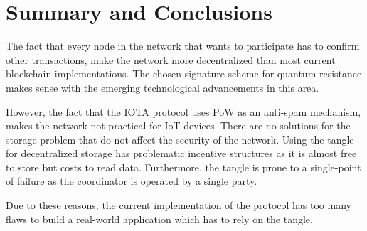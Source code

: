 \chapter{Summary and Conclusions}

The fact that every node in the network that wants to participate has to confirm other transactions, make the network more decentralized than most current blockchain implementations. The chosen signature scheme for quantum resistance makes sense with the emerging technological advancements in this area. 

However, the fact that the IOTA protocol uses PoW as an anti-spam mechanism, makes the network not practical for IoT devices. There are no solutions for the storage problem that do not affect the security of the network. Using the tangle for decentralized storage has problematic incentive structures as it is almost free to store but costs to read data. Furthermore, the tangle is prone to a single-point of failure as the coordinator is operated by a single party.

Due to these reasons, the current implementation of the protocol has too many flaws to build a real-world application which has to rely on the tangle.
